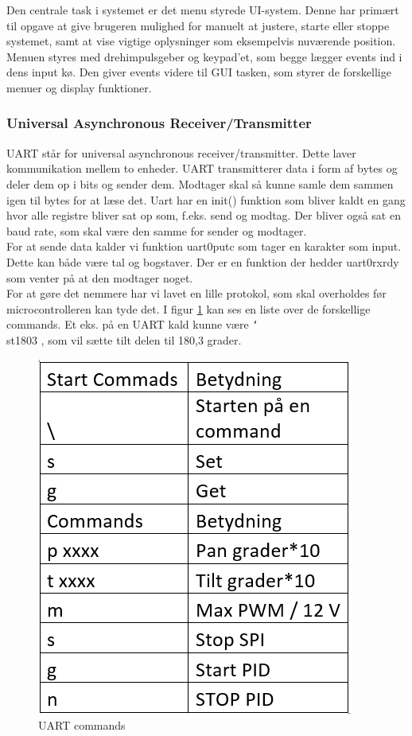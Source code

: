 Den centrale task i systemet er det menu styrede UI-system. Denne har primært til opgave at give brugeren mulighed for manuelt at justere, starte eller stoppe systemet, samt at vise vigtige oplysninger som eksempelvis nuværende position. Menuen styres med drehimpulsgeber og keypad'et, som begge lægger events ind i dens input kø. Den giver events videre til GUI tasken, som styrer de forskellige menuer og display funktioner.



\subsubsection{Universal Asynchronous Receiver/Transmitter}

UART står for universal asynchronous receiver/transmitter. Dette laver kommunikation mellem to enheder. UART transmitterer data i form af bytes og deler dem op i bits og sender dem. Modtager skal så kunne samle dem sammen igen til bytes for at læse det. Uart har en init() funktion som bliver kaldt en gang hvor alle registre bliver sat op som, f.eks. send og modtag. Der bliver også sat en baud rate, som skal være den samme for sender og modtager.
\\
For at sende data kalder vi funktion uart0\textunderscore putc som tager en karakter som input. Dette kan både være tal og bogstaver. Der er en funktion der hedder uart0\textunderscore rx\textunderscore rdy som venter på at den modtager noget.
\\
For at gøre det nemmere har vi lavet en lille protokol, som skal overholdes før microcontrolleren kan tyde det. I figur \ref{fig:UARTCMD} kan ses en liste over de forskellige commands. Et eks. på en UART kald kunne være \texttt{\char`\\}st1803 , som vil sætte tilt delen til 180,3 grader.

\begin{figure}[ht]
			\begin{center}
			\includegraphics[scale=0.5]{Billeder/UARTCMD.png}
			\end{center}
			\caption{UART commands}
			\label{fig:UARTCMD}
\end{figure}

